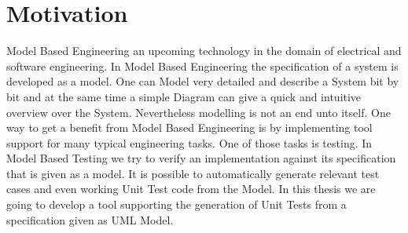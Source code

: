 \chapter{Motivation}
Model Based Engineering an upcoming technology in the domain of electrical and software engineering. In Model Based Engineering the specification of a system is developed as a model.
One can Model very detailed and describe a System bit by bit and at the same time a simple Diagram can give a quick and intuitive overview over the System. 
Nevertheless %
modelling is not an end unto itself. One way to get a benefit from Model Based Engineering is by implementing tool support for many typical engineering tasks. One of those tasks is testing. In Model Based Testing we try to verify an implementation against its specification that is given as a model. It is possible to automatically generate relevant test cases and even working Unit Test code from the Model. In this thesis we are going to develop a tool supporting the generation of Unit Tests from a specification given as UML Model.
